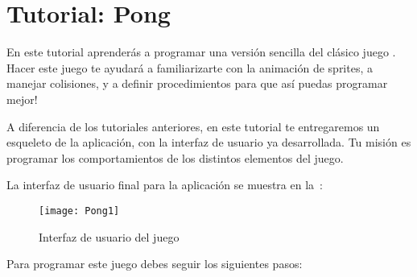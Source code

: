 \section{Tutorial: Pong}

En este tutorial aprenderás a programar una versión sencilla del
clásico juego . Hacer este juego te ayudará a
familiarizarte con la animación de sprites, a manejar colisiones, y a
definir procedimientos para que así puedas programar mejor!

A diferencia de los tutoriales anteriores, en este tutorial te
entregaremos un esqueleto de la aplicación, con la interfaz de usuario
ya desarrollada. Tu misión es programar los comportamientos de los
distintos elementos del juego.

La interfaz de usuario final para la aplicación se muestra en
la~:

\begin{figure}[H]
\vspace{3em}
\centering
\texttt{[image: Pong1]}
\caption{Interfaz de usuario del juego }
\label{fig:Pong1}
\end{figure}

Para programar este juego debes seguir los siguientes pasos:

